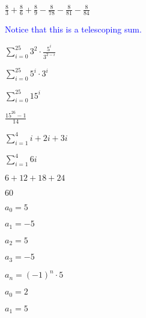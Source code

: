 \documentclass{exam}
\begin{document}
\begin{questions}
\begin{subparts}
\begin{center}
\( \frac{8}{3} + \frac{8}{6} + \frac{8}{9} - \frac{8}{78} - \frac{8}{81} - \frac{8}{84}\)

\textcolor{blue}{Notice that this is a telescoping sum.}

\end{center}


\begin{center}

\( \sum_{i=0}^{25} 3^2 \cdot \frac{{5^{i}}}{3^{2-i}} \)

\( \sum_{i=0}^{25} 5^{i} \cdot 3^{i} \)

\( \sum_{i=0}^{25} {15}^{i} \)

\( \frac{15^{26}-1}{14} \)

\end{center}


\begin{center}

\( \sum_{i=1}^{4} i + 2i + 3i \)

\( \sum_{i=1}^{4} 6i \)

\( 6 + 12 + 18 + 24 \)

\( 60 \)

\end{center}

\end{subparts}

\begin{subparts}

\begin{center}

\(a_0 = 5\)

\(a_1 = -5\)

\(a_2 = 5\)

\(a_3 = -5\)

\(a_n = (-1)^n \cdot 5\)

\end{center}


\begin{center}

\(a_0 = 2\)

\(a_1 = 5\)


\end{center}
\end{subparts}
\end{questions}
\end{document}
